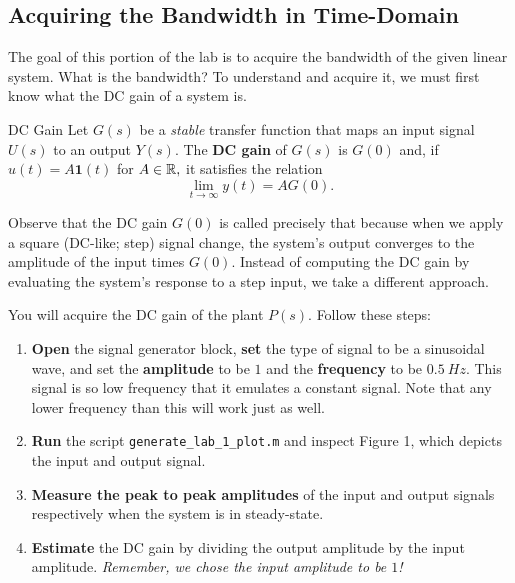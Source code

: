 \subsection{Acquiring the Bandwidth in Time-Domain}
The goal of this portion of the lab is to acquire the bandwidth of the
given linear system. What is the bandwidth? To understand and acquire it,
we must first know what the DC gain of a system is.
%
\begin{definition}[label={def:lab1:dcgain}]{DC Gain}
  Let \(G(s)\) be a \emph{stable} transfer function
  that maps an input signal \(U(s)\) to an
  output \(Y(s).\) The \textbf{DC gain} of \(G(s)\) is \(G(0)\) and,
  if \(u(t) = A \mathbf{1}(t)\) for \(A \in \mathbb{R},\) it satisfies the relation
  \[
    \lim_{t\to \infty} y(t) = A G(0).
  \]
\end{definition}
%
Observe that the DC gain \(G(0)\) is called precisely that because when we
apply a square (DC-like; step) signal change, the system's output converges
to the amplitude of the input times \(G(0).\)
%
Instead of computing the DC gain by evaluating the system's response to a step
input, we take a different approach.
%
\begin{procedure}[label={proc:lab1:p1}]
  You will acquire the DC gain of the plant \(P(s)\). Follow these steps:
  \begin{enumerate}[label=(\arabic*)]
    \item{
      \textbf{Open} the signal generator block, \textbf{set} the type of signal
      to be a sinusoidal wave, and set the
      \textbf{amplitude} to be \(1\) and the \textbf{frequency}
      to be \(\SI{0.5}{Hz}.\) This signal is so low frequency that it
      emulates a constant signal. Note that any lower frequency than this will
      work just as well.
    }
    \item{
      \textbf{Run} the script \texttt{generate\_lab\_1\_plot.m} and inspect
      Figure 1, which depicts the input and output signal.
    }
    \item{
      \textbf{Measure the peak to peak amplitudes} of the input and output signals respectively when the system is in steady-state.
    }
    \item{
      \textbf{Estimate} the DC gain by dividing the output amplitude
      by the input amplitude. \emph{Remember, we chose the input amplitude
      to be \(1\)!}
    }
  \end{enumerate}
\end{procedure}
%
